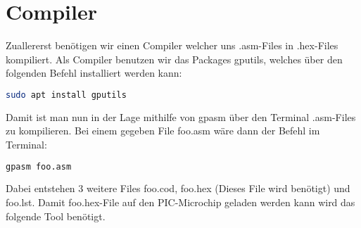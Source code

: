 \section{Compiler}
\label{sec:compiler}
Zuallererst benötigen wir einen Compiler welcher uns {\ttfamily .asm}-Files in {\ttfamily .hex}-Files kompiliert. Als Compiler benutzen wir das Packages {\ttfamily gputils}, welches über den folgenden Befehl installiert werden kann:
\begin{lstlisting}[language=bash]
                            sudo apt install gputils
\end{lstlisting}

Damit ist man nun in der Lage mithilfe von {\ttfamily gpasm} über den Terminal {\ttfamily .asm}-Files zu kompilieren. Bei einem gegeben File {\ttfamily foo.asm} wäre dann der Befehl im Terminal:
\begin{lstlisting}[language=bash]
                                gpasm foo.asm
\end{lstlisting} 
Dabei entstehen 3 weitere Files {\ttfamily foo.cod}, {\ttfamily foo.hex} (Dieses File wird benötigt) und {\ttfamily foo.lst}. Damit {\ttfamily foo.hex}-File auf den PIC-Microchip geladen werden kann wird das folgende Tool benötigt.
